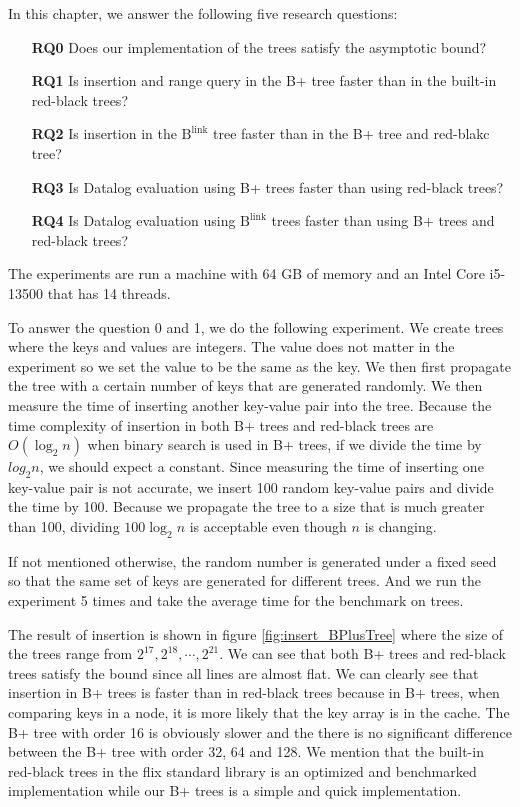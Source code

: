 \documentclass[twoside,11pt,openright]{report}
\theoremstyle{definition}
\begin{document}
In this chapter, we answer the following five research questions:

\begin{itemize}
  \item[\textbf{RQ0}] Does our implementation of the trees satisfy the asymptotic bound?
  \item[\textbf{RQ1}] Is insertion and range query in the B+ tree faster than in the built-in red-black trees?
  \item[\textbf{RQ2}] Is insertion in the $\text{B}^{\text{link}}$ tree faster than in the B+ tree and red-blakc tree?
  \item[\textbf{RQ3}] Is Datalog evaluation using B+ trees faster than using red-black trees?
  \item[\textbf{RQ4}] Is Datalog evaluation using $\text{B}^{\text{link}}$ trees faster than using B+ trees and red-black trees?
\end{itemize}

The experiments are run a machine with 64 GB of memory and an Intel Core i5-13500 that has 14 threads.

To answer the question 0 and 1, we do the following experiment. We create trees where the keys and values are integers. The value does not matter in the experiment so we set the value to be the same as the key. We then first propagate the tree with a certain number of keys that are generated randomly. We then measure the time of inserting another key-value pair into the tree. Because the time complexity of insertion in both B+ trees and red-black trees are $O(\log_2 n)$ when binary search is used in B+ trees, if we divide the time by $log_2 n$, we should expect a constant. Since measuring the time of inserting one key-value pair is not accurate, we insert 100 random key-value pairs and divide the time by 100. Because we propagate the tree to a size that is much greater than 100, dividing $100 \log_2 n$ is acceptable even though $n$ is changing.

If not mentioned otherwise, the random number is generated under a fixed seed so that the same set of keys are generated for different trees. And we run the experiment 5 times and take the average time for the benchmark on trees.

The result of insertion is shown in figure \ref{fig:insert_BPlusTree} where the size of the trees range from $2^{17}, 2^{18}, \cdots, 2^{21}$. We can see that both B+ trees and red-black trees satisfy the bound since all lines are almost flat. We can clearly see that insertion in B+ trees is faster than in red-black trees because in B+ trees, when comparing keys in a node, it is more likely that the key array is in the cache. The B+ tree with order 16 is obviously slower and the there is no significant difference between the B+ tree with order 32, 64 and 128. We mention that the built-in red-black trees in the flix standard library is an optimized and benchmarked implementation while our B+ trees is a simple and quick implementation.
\end{document}
